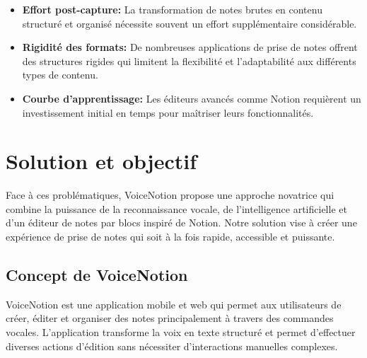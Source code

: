 \begin{itemize}
    \item \textbf{Effort post-capture:} La transformation de notes brutes en contenu structuré et organisé nécessite souvent un effort supplémentaire considérable.
    
    \item \textbf{Rigidité des formats:} De nombreuses applications de prise de notes offrent des structures rigides qui limitent la flexibilité et l'adaptabilité aux différents types de contenu.
    
    \item \textbf{Courbe d'apprentissage:} Les éditeurs avancés comme Notion requièrent un investissement initial en temps pour maîtriser leurs fonctionnalités.
\end{itemize}


\section{Solution et objectif}

Face à ces problématiques, VoiceNotion propose une approche novatrice qui combine la puissance de la reconnaissance vocale, de l'intelligence artificielle et d'un éditeur de notes par blocs inspiré de Notion. Notre solution vise à créer une expérience de prise de notes qui soit à la fois rapide, accessible et puissante.

\subsection{Concept de VoiceNotion}

VoiceNotion est une application mobile et web qui permet aux utilisateurs de créer, éditer et organiser des notes principalement à travers des commandes vocales. L'application transforme la voix en texte structuré et permet d'effectuer diverses actions d'édition sans nécessiter d'interactions manuelles complexes.

